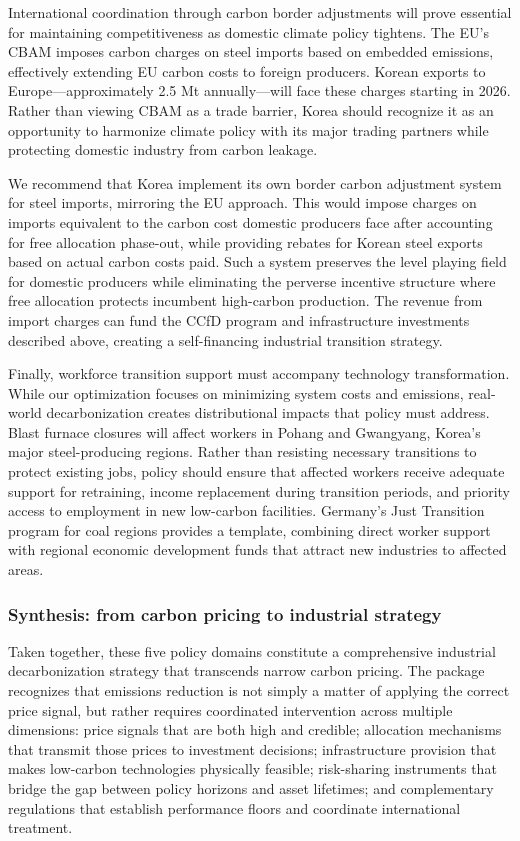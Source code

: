 \documentclass[preprint,1p,authoryear]{elsarticle}
\begin{document}
International coordination through carbon border adjustments will prove essential for maintaining competitiveness as domestic climate policy tightens. The EU's CBAM imposes carbon charges on steel imports based on embedded emissions, effectively extending EU carbon costs to foreign producers. Korean exports to Europe—approximately 2.5 Mt annually—will face these charges starting in 2026. Rather than viewing CBAM as a trade barrier, Korea should recognize it as an opportunity to harmonize climate policy with its major trading partners while protecting domestic industry from carbon leakage.

We recommend that Korea implement its own border carbon adjustment system for steel imports, mirroring the EU approach. This would impose charges on imports equivalent to the carbon cost domestic producers face after accounting for free allocation phase-out, while providing rebates for Korean steel exports based on actual carbon costs paid. Such a system preserves the level playing field for domestic producers while eliminating the perverse incentive structure where free allocation protects incumbent high-carbon production. The revenue from import charges can fund the CCfD program and infrastructure investments described above, creating a self-financing industrial transition strategy.

Finally, workforce transition support must accompany technology transformation. While our optimization focuses on minimizing system costs and emissions, real-world decarbonization creates distributional impacts that policy must address. Blast furnace closures will affect workers in Pohang and Gwangyang, Korea's major steel-producing regions. Rather than resisting necessary transitions to protect existing jobs, policy should ensure that affected workers receive adequate support for retraining, income replacement during transition periods, and priority access to employment in new low-carbon facilities. Germany's Just Transition program for coal regions provides a template, combining direct worker support with regional economic development funds that attract new industries to affected areas.

\subsubsection{Synthesis: from carbon pricing to industrial strategy}

Taken together, these five policy domains constitute a comprehensive industrial decarbonization strategy that transcends narrow carbon pricing. The package recognizes that emissions reduction is not simply a matter of applying the correct price signal, but rather requires coordinated intervention across multiple dimensions: price signals that are both high and credible; allocation mechanisms that transmit those prices to investment decisions; infrastructure provision that makes low-carbon technologies physically feasible; risk-sharing instruments that bridge the gap between policy horizons and asset lifetimes; and complementary regulations that establish performance floors and coordinate international treatment.
\end{document}
